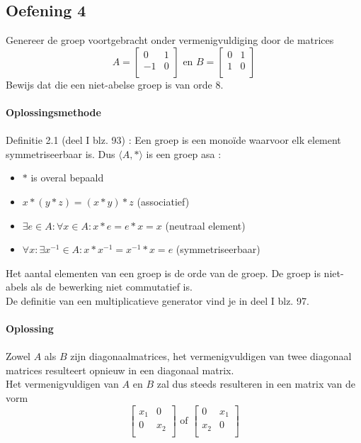 \documentclass[11pt,a4paper,titlepage]{article}
\begin{document}
\subsection{Oefening 4}
Genereer de groep voortgebracht onder vermenigvuldiging door de matrices
\[
A =
\begin{bmatrix}
    0 & 1 \\
   -1 & 0 \\
\end{bmatrix}
\text{ en }
B = 
\begin{bmatrix}
    0       & 1 \\
   1 & 0 \\
\end{bmatrix}
\]
Bewijs dat die een niet-abelse groep is van orde 8.
\\ \\ \textbf{Oplossingsmethode} \\ \\
Definitie 2.1 (deel I blz. 93) : Een groep is een monoïde waarvoor elk element symmetriseerbaar is. Dus $\langle A, * \rangle$ is een groep asa :
	\begin{itemize}
		\item $*$ is overal bepaald
		\item $x*(y*z) = (x*y)*z$ \quad (associatief)
		\item $\exists e \in A : \forall x \in A : x*e = e*x = x$ \quad (neutraal element)
		\item $\forall x : \exists x^{-1} \in A : x*x^{-1} = x^{-1}*x =e$ \quad (symmetriseerbaar)
	\end{itemize}
Het aantal elementen van een groep is de orde van de groep. De groep is niet-abels als de bewerking niet commutatief is. \\
De definitie van een multiplicatieve generator vind je in deel I blz. 97.
\\ \\ \textbf{Oplossing} \\ \\
Zowel $A$ als $B$ zijn diagonaalmatrices, het vermenigvuldigen van twee diagonaal matrices resulteert opnieuw in een diagonaal matrix. \\
Het vermenigvuldigen van $A$ en $B$ zal dus steeds resulteren in een matrix van de vorm
\[
\begin{bmatrix}
    x_1 & 0 \\
    0 & x_2 \\
\end{bmatrix}
\text{ of } 
\begin{bmatrix}
    0       & x_1 \\
   x_2 & 0 \\
\end{bmatrix}
\]
\end{document}
